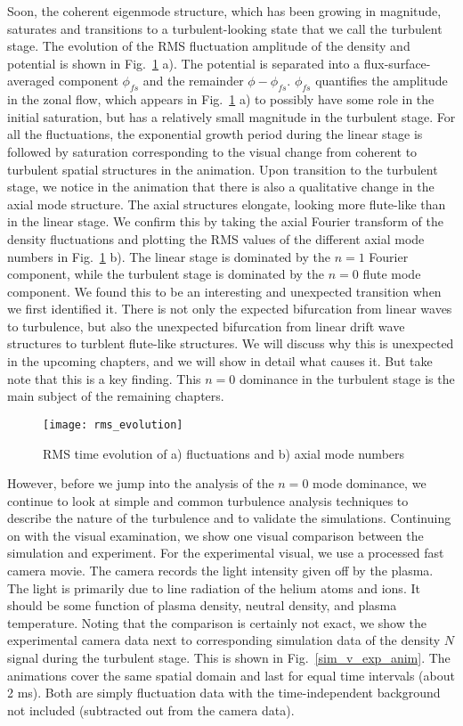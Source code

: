Soon, the coherent eigenmode structure, which has been growing in magnitude, saturates and transitions to a turbulent-looking state that we call the turbulent stage.
The evolution of the RMS fluctuation amplitude of the density and potential is shown in Fig.~\ref{rms_evolution} a). The potential is separated into a flux-surface-averaged component $\phi_{fs}$
and the remainder $\phi-\phi_{fs}$. $\phi_{fs}$ quantifies the amplitude in the zonal flow, which appears in Fig.~\ref{rms_evolution} a) to possibly have some role in the initial saturation, but
has a relatively small magnitude in the turbulent stage.
For all the fluctuations, the exponential growth period during the linear stage is followed by saturation corresponding to the
visual change from coherent to turbulent spatial structures in the animation. 
Upon transition to the turbulent stage, we notice in the animation that there is also a qualitative change in the axial
mode structure. The axial structures elongate, looking more flute-like than in the linear stage. We confirm this by taking the axial Fourier transform of the density fluctuations and plotting
the RMS values of the different axial mode numbers in Fig.~\ref{rms_evolution} b). The linear stage is dominated by the $n=1$ Fourier component, while the turbulent stage is dominated
by the $n=0$ flute mode component. We found this to be an interesting and unexpected transition when we first identified it. There is not only the expected bifurcation from linear waves to turbulence,
but also the unexpected bifurcation from linear drift wave structures to turblent flute-like structures. We will discuss why this is unexpected in the upcoming chapters, and we will show in detail
what causes it. But take note that this is a key finding. This $n=0$ dominance in the turbulent stage is the main subject of the remaining chapters.


\begin{figure}[!ht]
\centerline{\texttt{[image: rms\_evolution]}}
\caption{RMS time evolution of a) fluctuations and b) axial mode numbers}
\label{rms_evolution}
\end{figure}


However, before we jump into the analysis of the $n=0$ mode dominance, we continue to look at simple and common turbulence analysis techniques to describe the nature of the turbulence
and to validate the simulations.
Continuing on with the visual examination, we show one visual comparison between the simulation and experiment. For the experimental visual, we use a processed
fast camera movie. The camera records the light intensity given off by the plasma. The light is primarily due to line radiation of the helium atoms and ions. It should be some function
of plasma density, neutral density, and plasma temperature. Noting that the comparison is certainly not exact, we show the experimental camera data next to corresponding simulation
data of the density $N$ signal during the turbulent stage. This is shown in Fig.~\ref{sim_v_exp_anim}. 
The animations cover the same spatial domain and last for equal time intervals (about 2 ms). Both are simply fluctuation
data with the time-independent background not included (subtracted out from the camera data). 


